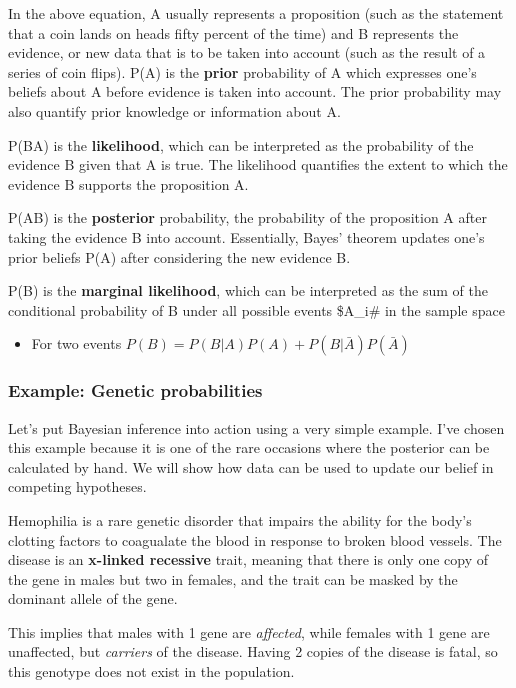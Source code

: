 \documentclass[11pt]{article}
\providecommand{\tightlist}{%
      \setlength{\itemsep}{0pt}\setlength{\parskip}{0pt}}
\begin{document}
In the above equation, A usually represents a proposition (such as the
statement that a coin lands on heads fifty percent of the time) and B
represents the evidence, or new data that is to be taken into account
(such as the result of a series of coin flips). P(A) is the
\textbf{prior} probability of A which expresses one's beliefs about A
before evidence is taken into account. The prior probability may also
quantify prior knowledge or information about A.

P(B\textbar{}A) is the \textbf{likelihood}, which can be interpreted as
the probability of the evidence B given that A is true. The likelihood
quantifies the extent to which the evidence B supports the proposition
A.

P(A\textbar{}B) is the \textbf{posterior} probability, the probability
of the proposition A after taking the evidence B into account.
Essentially, Bayes' theorem updates one's prior beliefs P(A) after
considering the new evidence B.

P(B) is the \textbf{marginal likelihood}, which can be interpreted as
the sum of the conditional probability of B under all possible events
\$A\_i\# in the sample space

\begin{itemize}
\tightlist
\item
  For two events \(P(B) = P(B|A)P(A) + P(B|\bar{A})P(\bar{A})\)
\end{itemize}

    \hypertarget{example-genetic-probabilities}{%
\subsubsection{Example: Genetic
probabilities}\label{example-genetic-probabilities}}

Let's put Bayesian inference into action using a very simple example.
I've chosen this example because it is one of the rare occasions where
the posterior can be calculated by hand. We will show how data can be
used to update our belief in competing hypotheses.

Hemophilia is a rare genetic disorder that impairs the ability for the
body's clotting factors to coagualate the blood in response to broken
blood vessels. The disease is an \textbf{x-linked recessive} trait,
meaning that there is only one copy of the gene in males but two in
females, and the trait can be masked by the dominant allele of the gene.

This implies that males with 1 gene are \emph{affected}, while females
with 1 gene are unaffected, but \emph{carriers} of the disease. Having 2
copies of the disease is fatal, so this genotype does not exist in the
population.
\end{document}
